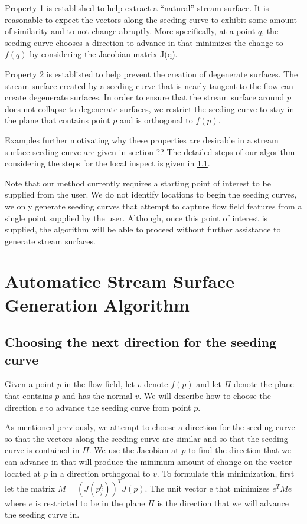 \documentclass{vgtc}                          %
\begin{document}
Property 1 is established to help extract a ``natural'' stream surface.
It is reasonable to expect the vectors along the seeding curve to exhibit some amount of similarity and to not change abruptly.
More specifically, at a point $q$, the seeding curve chooses a direction to advance in that minimizes the change to $f(q)$ by considering the Jacobian matrix J(q).

Property 2 is establisted to help prevent the creation of degenerate surfaces.
The stream surface created by a seeding curve that is nearly tangent to the flow can create degenerate surfaces.
In order to ensure that the stream surface around $p$ does not collapse to degenerate surfaces, we restrict the seeding curve to stay in the plane that contains point $p$ and is orthogonal to $f(p)$.

Examples further motivating why these properties are desirable in a stream surface seeding curve are given in section ??
The detailed steps of our algorithm considering the steps for the local inspect is given in \ref{ssec:next_direction}.

Note that our method currently requires a starting point of interest to be supplied from the user.
We do not identify locations to begin the seeding curves, we only generate seeding curves that attempt to capture flow field features from a single point supplied by the user.
Although, once this point of interest is supplied, the algorithm will be able to proceed without further assistance to generate stream surfaces.

\section{Automatice Stream Surface Generation Algorithm}  \label{sec:algorithm}

\subsection{Choosing the next direction for the seeding curve} \label{ssec:next_direction}

Given a point $p$ in the flow field, let $v$ denote $f(p)$ and let $\Pi$ denote the plane that contains $p$ and has the normal $v$.
We will describe how to choose the direction $e$ to advance the seeding curve from point $p$.

As mentioned previously, we attempt to choose a direction for the seeding curve so that the vectors along the seeding curve are similar and so that the seeding curve is contained in $\Pi$.
We use the Jacobian at $p$ to find the direction that we can advance in that will produce the minimum amount of change on the vector located at $p$ in a direction orthogonal to $v$.
To formulate this minimization, first let the matrix $M = (J(p_j^k))^TJ(p)$.
The unit vector e that minimizes $e^TM e$ where $e$ is restricted to be in the plane $\Pi$ is the direction that we will advance the seeding curve in.
\end{document}
